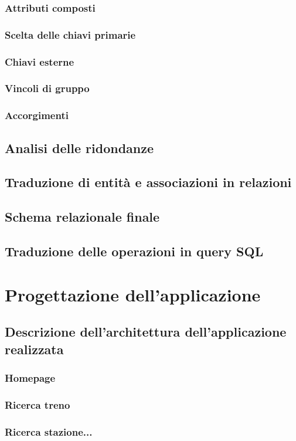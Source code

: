 \documentclass[a4paper,12pt]{report}
\begin{document}
	\subsection{Attributi composti}
	\subsection{Scelta delle chiavi primarie}
	\subsection{Chiavi esterne}
	\subsection{Vincoli di gruppo}
	\subsection{Accorgimenti}
	\section{Analisi delle ridondanze}
	\section{Traduzione di entità e associazioni in relazioni}
	\section{Schema relazionale finale}
	\section{Traduzione delle operazioni in query SQL}
	\chapter{Progettazione dell'applicazione}
	
	\section{Descrizione dell'architettura dell'applicazione realizzata}
	\subsection{Homepage}
	\subsection{Ricerca treno}
	\subsection{Ricerca stazione...}
\end{document}
